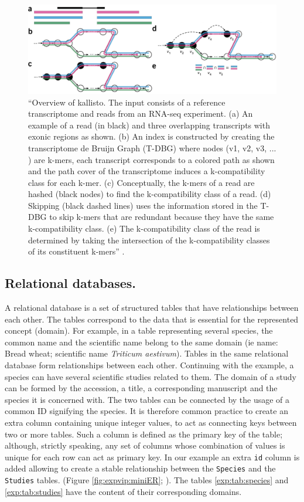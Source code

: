 \begin{figure}
\includegraphics[width=1\textwidth]{LitReview/Figures/kallisto.pdf}
\caption[Overview of kallisto.]{``Overview of kallisto. The input consists of a reference transcriptome and reads from an RNA-seq experiment. (a) An example of a read (in black) and three overlapping transcripts with exonic regions as shown. (b) An index is constructed by creating the transcriptome de Bruijn Graph (T-DBG) where
nodes (v1, v2, v3, ... ) are k-mers, each transcript corresponds to a colored path as shown and the path cover of the transcriptome induces a k-compatibility class for each k-mer. (c) Conceptually, the k-mers of a read are hashed (black nodes) to find the k-compatibility class of a read. (d) Skipping (black dashed lines) uses the information stored in the T-DBG to skip k-mers that are redundant because they have the same k-compatibility class. (e) The k-compatibility class of the read is determined by taking the intersection of the k-compatibility classes of its constituent k-mers'' \citep{Bray2016}.}
\label{fig:exp:kallisto}
\end{figure}


\subsection{Relational databases.}
A relational database is a set of structured tables that have relationships between each other. 
The tables correspond to the data that is essential for the represented concept (domain).
For example, in a table representing several species, the common name and the scientific name belong to the same domain (ie name: Bread wheat; scientific name \textit{Triticum aestivum}). 
Tables in the same relational database form relationships between each other. 
Continuing with the example, a species can have several scientific studies related to them. 
The domain of a study can be formed by the accession, a title, a corresponding manuscript and the species it is concerned with. The two tables can be connected by the usage of a common ID signifying the species. It is therefore common practice to create an extra column containing unique integer values, to act as connecting keys between two or more tables. Such a column is defined as the primary key of the table; although, strictly speaking, any set of columns whose combination of values is unique for each row can act as primary key. 
In our example an extra \texttt{id} column is added allowing to create a stable relationship between the \verb|Species| and the \verb|Studies| tables.
 (Figure \ref{fig:expvip:miniER}; \citealt{Codd1970}).
The tables \ref{exp:tab:species} and \ref{exp:tab:studies} have the content of their corresponding domains. 

